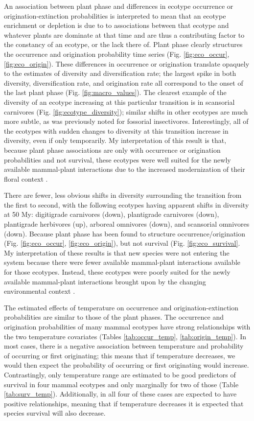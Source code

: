 \documentclass[12pt,letterpaper]{article}
\begin{document}
An association between plant phase and differences in ecotype occurrence or origination-extinction probabilities is interpreted to mean that an ecotype enrichment or depletion is due to to associations between that ecotype and whatever plants are dominate at that time and are thus a contributing factor to the constancy of an ecotype, or the lack there of. Plant phase clearly structures the occurrence and origination probability time series (Fig. \ref{fig:eco_occur}, \ref{fig:eco_origin}). These differences in occurrence or origination translate opaquely to the estimates of diversity and diversification rate; the largest spike in both diversity, diversification rate, and origination rate all correspond to the onset of the last plant phase (Fig. \ref{fig:macro_values}). The clearest example of the diversity of an ecotype increasing at this particular transition is in scansorial carnivores (Fig. \ref{fig:ecotype_diversity}); similar shifts in other ecotypes are much more subtle, as was previously noted for fossorial insectivores. Interestingly, all of the ecotypes with sudden changes to diversity at this transition increase in diversity, even if only temporarily. My interpretation of this result is that, because plant phase associations are only with occurrence or origination probabilities and not survival, these ecotypes were well suited for the newly available mammal-plant interactions due to the increased modernization of their floral context \citep{Graham2011a}.

There are fewer, less obvious shifts in diversity surrounding the transition from the first to second, with the following ecotypes having apparent shifts in diversity at 50 My: digitigrade carnivores (down), plantigrade carnivores (down), plantigrade herbivores (up), arboreal omnivores (down), and scansorial omnivores (down). Because plant phase has been found to structure occurrence/origination (Fig. \ref{fig:eco_occur}, \ref{fig:eco_origin}), but not survival (Fig. \ref{fig:eco_survival}. My interpretation of these results is that new species were not entering the system because there were fewer available mammal-plant interactions available for those ecotypes. Instead, these ecotypes were poorly suited for the newly available mammal-plant interactions brought upon by the changing environmental context \citep{Graham2011a}.

The estimated effects of temperature on occurrence and origination-extinction probabilities are similar to those of the plant phases. The occurrence and origination probabilities of many mammal ecotypes have strong relationships with the two temperature covariates (Tables \ref{tab:occur_temp}, \ref{tab:origin_temp}). In most cases, there is a negative association between temperature and probability of occurring or first originating; this means that if temperature decreases, we would then expect the probability of occurring or first originating would increase. Contrastingly, only temperature range are estimated to be good predictors of survival in four mammal ecotypes and only marginally for two of those (Table \ref{tab:surv_temp}). Additionally, in all four of these cases are expected to have positive relationships, meaning that if temperature decreases it is expected that species survival will also decrease.
\end{document}
